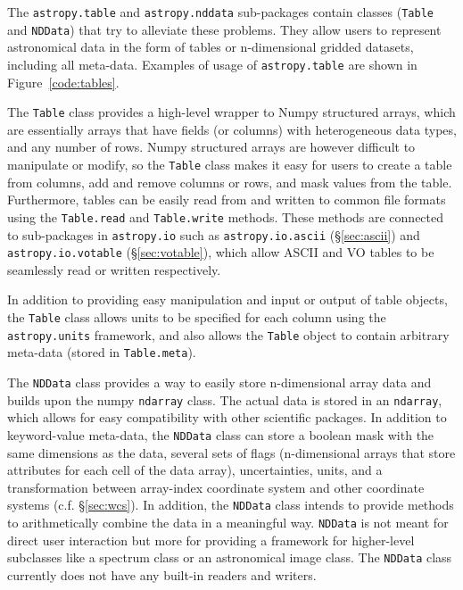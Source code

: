 \documentclass[traditabstract]{aa}
\begin{document}
The \texttt{astropy.table} and \texttt{astropy.nddata} sub-packages contain
classes (\texttt{Table} and \texttt{NDData}) that try to alleviate these
problems. They allow users to represent astronomical data in the form of tables
or n-dimensional gridded datasets, including all meta-data. Examples of usage
of \texttt{astropy.table} are shown in Figure~\ref{code:tables}.

The \texttt{Table} class provides a high-level wrapper to Numpy structured
arrays, which are essentially arrays that have fields (or columns) with
heterogeneous data types, and any number of rows. Numpy structured arrays are
however difficult to manipulate or modify, so the \texttt{Table} class makes it
easy for users to create a table from columns, add and remove columns or rows,
and mask values from the table. Furthermore, tables can be easily read from and
written to common file formats using the \texttt{Table.read} and
\texttt{Table.write} methods. These methods are connected to sub-packages in
\texttt{astropy.io} such as \texttt{astropy.io.ascii} (\S\ref{sec:ascii}) and
\texttt{astropy.io.votable} (\S\ref{sec:votable}), which allow ASCII and VO
tables to be seamlessly read or written respectively.

In addition to providing easy manipulation and input or output of table objects,
the \texttt{Table} class allows units to be specified for each column using the
\texttt{astropy.units} framework, and also allows the \texttt{Table} object to
contain arbitrary meta-data (stored in \texttt{Table.meta}).

The \texttt{NDData} class provides a way to easily store n-dimensional array
data and builds upon the \gls{numpy} \texttt{ndarray} class. The actual data is
stored in an \texttt{ndarray}, which allows for easy compatibility with
other scientific packages. In addition to keyword-value meta-data, the
\texttt{NDData} class can store a boolean mask with the same dimensions as the
data, several sets of flags (n-dimensional arrays that store attributes for
each cell of the data array), uncertainties, units, and a transformation
between array-index coordinate system and other coordinate systems (c.f.
\S\ref{sec:wcs}). In addition, the \texttt{NDData} class intends to provide
methods to arithmetically combine the data in a meaningful way. \texttt{NDData}
is not meant for direct user interaction but more for providing a framework for
higher-level subclasses like a spectrum class or an astronomical image class.
The \texttt{NDData} class currently does not have any built-in readers and
writers.
\end{document}
